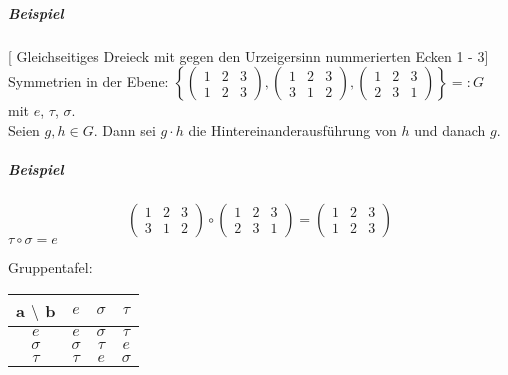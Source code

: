 \documentclass[14pt,a4paper]{article}
\begin{document}
  \subparagraph{Beispiel}
  [ Gleichseitiges Dreieck mit gegen den Urzeigersinn nummerierten Ecken 1 - 3]\\
  Symmetrien in der Ebene: $ \left\{ \begin{pmatrix} 1 & 2 & 3 \\ 1 & 2 &
      3 \end{pmatrix}, \begin{pmatrix} 1 & 2 & 3 \\ 3 & 1 & 2 \end{pmatrix}, \begin{pmatrix} 1 & 2 & 3 \\ 2 &
      3 & 1 \end{pmatrix} \right\} =: G$ \\
  mit $e$, $\tau$, $\sigma$.\\
  Seien $g,h \in G$. Dann sei $g \cdot h$ die Hintereinanderausführung von $h$
  und danach $g$.

  \subparagraph{Beispiel}
  $$ \begin{pmatrix} 1 & 2 & 3 \\ 3 & 1 & 2 \end{pmatrix} \circ \begin{pmatrix}
    1 & 2 & 3 \\ 2 & 3 & 1 \end{pmatrix} = \begin{pmatrix} 1 & 2 & 3 \\ 1 & 2 &
    3 \end{pmatrix}$$
  $\tau \circ \sigma = e$

  Gruppentafel:\\
  \begin{tabular}{ c | c | c | c }
	  a $\setminus$ b & $e$ & $\sigma$ & $\tau$ \\ \hline
		$e$             & $e$ & $\sigma$ & $\tau$ \\ \hline
		$\sigma$        & $\sigma$ & $\tau$ & $e$ \\ \hline
		$\tau$          & $\tau$ & $e$ & $\sigma$ \\
	\end{tabular}
\end{document}
